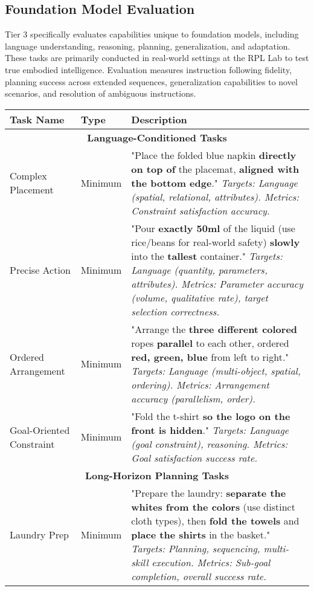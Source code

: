 \subsection{Foundation Model Evaluation}

Tier 3 specifically evaluates capabilities unique to foundation models, including language understanding, reasoning, planning, generalization, and adaptation. These tasks are primarily conducted in real-world settings at the RPL Lab to test true embodied intelligence. Evaluation measures instruction following fidelity, planning success across extended sequences, generalization capabilities to novel scenarios, and resolution of ambiguous instructions.

\begin{table}[h]
\centering
\begin{tabular}{|p{3.5cm}|p{2cm}|p{8.5cm}|}
\hline
\textbf{Task Name} & \textbf{Type} & \textbf{Description} \\
\hline
\multicolumn{3}{|c|}{\textbf{Language-Conditioned Tasks}} \\
\hline
Complex Placement & Minimum & "Place the folded blue napkin \textbf{directly on top of} the placemat, \textbf{aligned with the bottom edge}." \textit{Targets: Language (spatial, relational, attributes). Metrics: Constraint satisfaction accuracy.} \\
\hline
Precise Action & Minimum & "Pour \textbf{exactly 50ml} of the liquid (use rice/beans for real-world safety) \textbf{slowly} into the \textbf{tallest} container." \textit{Targets: Language (quantity, parameters, attributes). Metrics: Parameter accuracy (volume, qualitative rate), target selection correctness.} \\
\hline
Ordered Arrangement & Minimum & "Arrange the \textbf{three different colored} ropes \textbf{parallel} to each other, ordered \textbf{red, green, blue} from left to right." \textit{Targets: Language (multi-object, spatial, ordering). Metrics: Arrangement accuracy (parallelism, order).} \\
\hline
Goal-Oriented Constraint & Minimum & "Fold the t-shirt \textbf{so the logo on the front is hidden}." \textit{Targets: Language (goal constraint), reasoning. Metrics: Goal satisfaction success rate.} \\
\hline
\multicolumn{3}{|c|}{\textbf{Long-Horizon Planning Tasks}} \\
\hline
Laundry Prep & Minimum & "Prepare the laundry: \textbf{separate the whites from the colors} (use distinct cloth types), then \textbf{fold the towels} and \textbf{place the shirts} in the basket." \textit{Targets: Planning, sequencing, multi-skill execution. Metrics: Sub-goal completion, overall success rate.} \\

\end{tabular}
\end{table}

